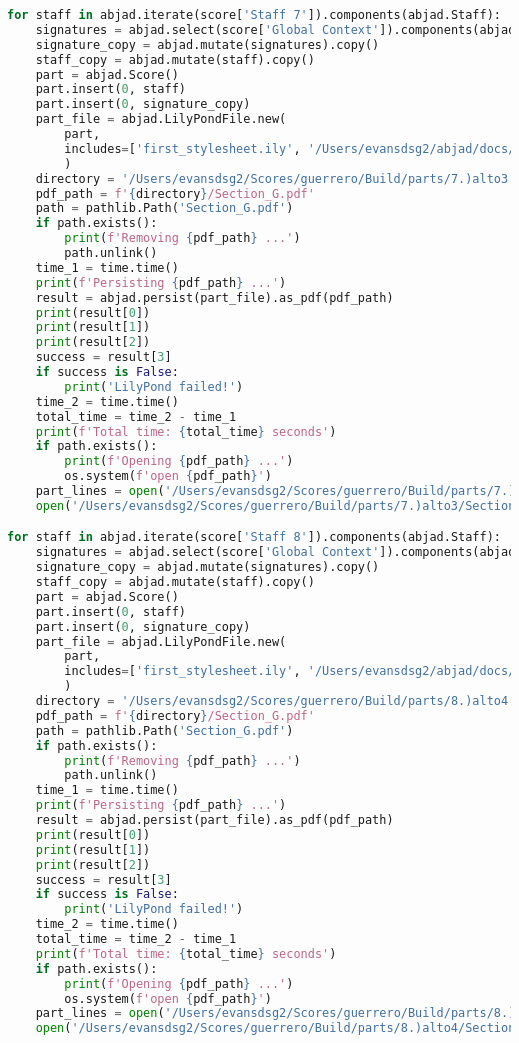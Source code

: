 \begin{lstlisting}[language=Python, caption=Invocation Source Code]
for staff in abjad.iterate(score['Staff 7']).components(abjad.Staff):
    signatures = abjad.select(score['Global Context']).components(abjad.Staff)
    signature_copy = abjad.mutate(signatures).copy()
    staff_copy = abjad.mutate(staff).copy()
    part = abjad.Score()
    part.insert(0, staff)
    part.insert(0, signature_copy)
    part_file = abjad.LilyPondFile.new(
        part,
        includes=['first_stylesheet.ily', '/Users/evansdsg2/abjad/docs/source/_stylesheets/abjad.ily'],
        )
    directory = '/Users/evansdsg2/Scores/guerrero/Build/parts/7.)alto3'
    pdf_path = f'{directory}/Section_G.pdf'
    path = pathlib.Path('Section_G.pdf')
    if path.exists():
        print(f'Removing {pdf_path} ...')
        path.unlink()
    time_1 = time.time()
    print(f'Persisting {pdf_path} ...')
    result = abjad.persist(part_file).as_pdf(pdf_path)
    print(result[0])
    print(result[1])
    print(result[2])
    success = result[3]
    if success is False:
        print('LilyPond failed!')
    time_2 = time.time()
    total_time = time_2 - time_1
    print(f'Total time: {total_time} seconds')
    if path.exists():
        print(f'Opening {pdf_path} ...')
        os.system(f'open {pdf_path}')
    part_lines = open('/Users/evansdsg2/Scores/guerrero/Build/parts/7.)alto3/Section_G.ly').readlines()
    open('/Users/evansdsg2/Scores/guerrero/Build/parts/7.)alto3/Section_G.ly', 'w').writelines(part_lines[15:-1])

for staff in abjad.iterate(score['Staff 8']).components(abjad.Staff):
    signatures = abjad.select(score['Global Context']).components(abjad.Staff)
    signature_copy = abjad.mutate(signatures).copy()
    staff_copy = abjad.mutate(staff).copy()
    part = abjad.Score()
    part.insert(0, staff)
    part.insert(0, signature_copy)
    part_file = abjad.LilyPondFile.new(
        part,
        includes=['first_stylesheet.ily', '/Users/evansdsg2/abjad/docs/source/_stylesheets/abjad.ily'],
        )
    directory = '/Users/evansdsg2/Scores/guerrero/Build/parts/8.)alto4'
    pdf_path = f'{directory}/Section_G.pdf'
    path = pathlib.Path('Section_G.pdf')
    if path.exists():
        print(f'Removing {pdf_path} ...')
        path.unlink()
    time_1 = time.time()
    print(f'Persisting {pdf_path} ...')
    result = abjad.persist(part_file).as_pdf(pdf_path)
    print(result[0])
    print(result[1])
    print(result[2])
    success = result[3]
    if success is False:
        print('LilyPond failed!')
    time_2 = time.time()
    total_time = time_2 - time_1
    print(f'Total time: {total_time} seconds')
    if path.exists():
        print(f'Opening {pdf_path} ...')
        os.system(f'open {pdf_path}')
    part_lines = open('/Users/evansdsg2/Scores/guerrero/Build/parts/8.)alto4/Section_G.ly').readlines()
    open('/Users/evansdsg2/Scores/guerrero/Build/parts/8.)alto4/Section_G.ly', 'w').writelines(part_lines[15:-1])


\end{lstlisting}
